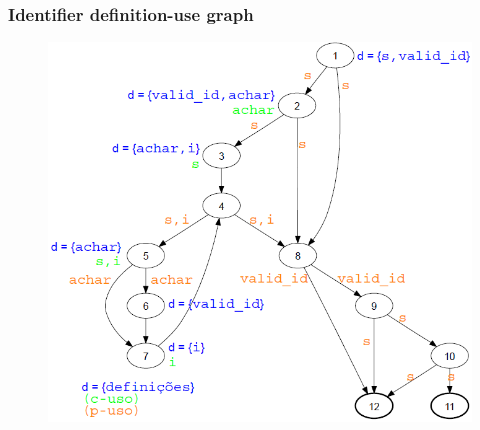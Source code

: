 \begin{frame}[hasprev=false, hasnext=false, c]
\frametitle{Identifier definition-use graph}
\label{example:identifier-dug}

\begin{figure}
	\centering
	\includegraphics[scale=.3]{aux/examples/identifier-dug/identifier-java-dug}
\end{figure}
\end{frame}

